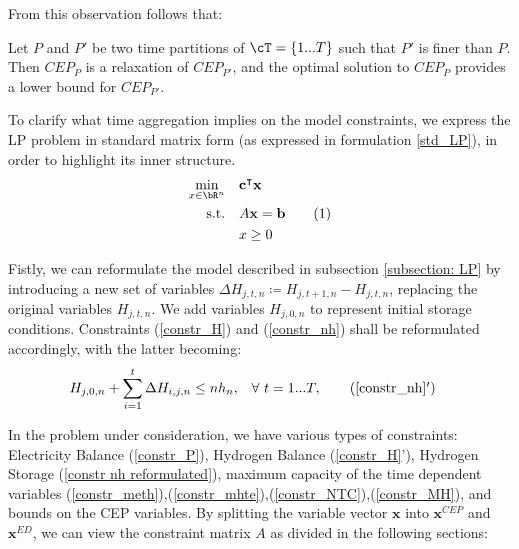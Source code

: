 From this observation follows that:
\begin{proposition}
  Let $P$ and $P'$ be two time partitions of $\cT=\{1...T\}$ such that $P'$ is finer than $P$. Then $CEP_P$ is a relaxation of $CEP_{P'}$, and the optimal solution to $CEP_{P}$ provides a lower bound for $CEP_{P'}$.
\end{proposition}

To clarify what time aggregation implies on the model constraints, we express the LP problem in standard matrix form (as expressed in formulation \ref{std_LP}), in order to highlight its inner structure.
\begin{align*}\label{std_LP}
\min_{x \in \bR^{n}}\quad &\mathbf{c}^\intercal \mathbf{x} \\ 
\text{s.t.} \quad& A\mathbf{x} = \mathbf{b} \stepcounter{equation}\tag{\theequation}\\
&x \geq 0
\end{align*}

Fistly, we can reformulate the model described in subsection \ref{subsection: LP} by introducing a new set of variables \(\Delta H_{j,t,n} \coloneqq H_{j,t+1,n} - H_{j,t,n}\), replacing the original variables \(H_{j,t,n}\). 
We add variables $H_{j,0,n}$ to represent initial storage conditions.
Constraints (\ref{constr_H}) and (\ref{constr_nh}) shall be reformulated accordingly, with the latter becoming:
\begin{align}
  H_{j,0,n} + \sum_{i=1}^{t} \Delta H_{i,j,n} \le nh_{n}, & \quad \forall\  t =1...T, \tag{\ref{constr_nh}$'$}\label{constr nh reformulated}
\end{align}

In the problem under consideration, we have various types of constraints: Electricity Balance (\ref{constr_P}), Hydrogen Balance (\ref{constr_H}'), Hydrogen Storage (\ref{constr nh reformulated}), maximum capacity of the time dependent variables (\ref{constr_meth}),(\ref{constr_mhte}),(\ref{constr_NTC}),(\ref{constr_MH}), and bounds on the CEP variables.
By splitting the variable vector $\mathbf{x}$ into $\mathbf{x}^{CEP}$ and $\mathbf{x}^{ED}$, we can view the constraint matrix $A$ as divided in the following sections:


